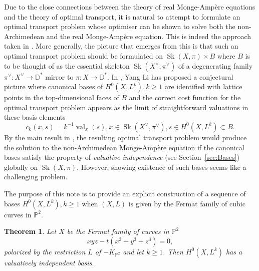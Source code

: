 \documentclass{article}
\newcommand{\op}[1]{\operatorname{#1}}
\newcommand{\val}{\operatorname{val}}
\newtheorem{theorem}{Theorem}
\begin{document}
Due to the close connections between the theory of real Monge-Ampère equations and the theory of optimal transport, it is  natural to attempt to formulate an optimal transport problem whose optimiser can be shown to solve both the non-Archimedean and the real Monge-Ampère equation. This is indeed the approach taken in \cite{HJMM,LiToric,AH}. More generally, the picture that emerges from this is that such an optimal transport problem should be formulated on $\operatorname{Sk}(X,\pi)\times B$ where $B$ is to be thought of as the essential skeleton  $\operatorname{Sk}(X^\vee,\pi^\vee)$ of a degenerating family $\pi^\vee:X^\vee\to \mathbb D^*$ mirror to $\pi:X\to\mathbb D^*$. In \cite{LiCanonicalBasis}, Yang Li has proposed a conjectural picture where canonical bases of $H^0(X,L^k), k\geq 1$ are identified with lattice points in the top-dimensional faces of $B$ and the correct cost function for the optimal transport problem appears as the limit of straightforward valuations in these basis elements 
\begin{equation}\label{eq:ValuativeCost} c_k(x,s) = k^{-1}\val_x(s), x\in \operatorname{Sk}(X^\vee,\pi^\vee), s\in H^0(X,L^k)\subset B. 
\end{equation}
By the main result in \cite{LiCanonicalBasis}, the resulting optimal transport problem would produce the solution to the non-Archimedean Monge-Ampère equation if the canonical bases satisfy the property of \emph{valuative independence} (see Section~\ref{sec:Bases}) globally on $\op{Sk}(X,\pi)$.  However, showing existence of such bases seems like a challenging problem. 

The purpose of this note is to provide an explicit construction of a sequence of bases $H^0(X,L^k), k\geq 1$ when $(X,L)$ is given by the Fermat family of cubic curves in $\mathbb P^2$. 
\begin{theorem}\label{thm:main}
    Let $X$ be the Fermat family of curves in $\mathbb P^2$ 
    $$ xyz-t(x^3+y^3+z^3) = 0, $$
    polarized by the restriction $L$ of $-K_{\mathbb P^2}$ and let $k\geq 1$. Then $H^0(X,L^k)$ has a valuatively independent basis.
\end{theorem}
\end{document}
